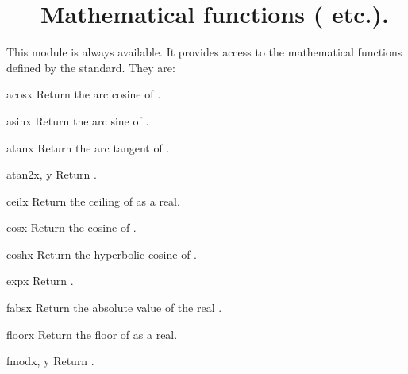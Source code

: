 \section{ ---
         Mathematical functions ( etc.).}



This module is always available.
It provides access to the mathematical functions defined by the \C{}
standard.
They are:

\begin{funcdesc}{acos}{x}
Return the arc cosine of .
\end{funcdesc}

\begin{funcdesc}{asin}{x}
Return the arc sine of .
\end{funcdesc}

\begin{funcdesc}{atan}{x}
Return the arc tangent of .
\end{funcdesc}

\begin{funcdesc}{atan2}{x, y}
Return .
\end{funcdesc}

\begin{funcdesc}{ceil}{x}
Return the ceiling of  as a real.
\end{funcdesc}

\begin{funcdesc}{cos}{x}
Return the cosine of .
\end{funcdesc}

\begin{funcdesc}{cosh}{x}
Return the hyperbolic cosine of .
\end{funcdesc}

\begin{funcdesc}{exp}{x}
Return .
\end{funcdesc}

\begin{funcdesc}{fabs}{x}
Return the absolute value of the real .
\end{funcdesc}

\begin{funcdesc}{floor}{x}
Return the floor of  as a real.
\end{funcdesc}

\begin{funcdesc}{fmod}{x, y}
Return .
\end{funcdesc}


